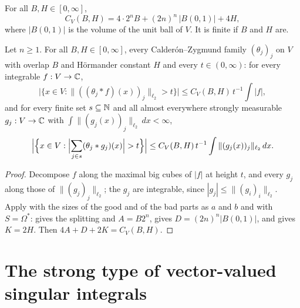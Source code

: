 \begin{definition}
\label{def:vector-weak-const}
\leanok
For all $B, H \in [0, \infty]$,
\[
  C_V(B, H) = 4 \cdot 2^n B + (2n)^n \, |B(0, 1)| + 4 H ,
\]
where $|B(0, 1)|$ is the volume of the unit ball of $V$. It is finite if $B$ and $H$ are.
\end{definition}

\begin{theorem}
\label{thm:vector-valued-weak-type}
\leanok
{}
Let $n \geq 1$. For all $B, H \in [0, \infty]$, every Calder\'on--Zygmund family
$(\theta_j)_j$ on $V$ with overlap $B$ and H\"ormander constant $H$ and every
$t \in (0, \infty)$:
for every integrable $f : V \to \mathbb{C}$,
\[
  \bigl|\{x \in V : \|((\theta_j * f)(x))_j\|_{\ell_2} > t\}\bigr|
  \leq C_V(B, H) \, t^{-1} \int |f| ,
\]
and for every finite set $s \subseteq \mathbb{N}$ and all almost everywhere strongly measurable
$g_j : V \to \mathbb{C}$ with $\int \|(g_j(x))_j\|_{\ell_2} \, dx < \infty$,
\[
  \Bigl|\Bigl\{x \in V : \Bigl|\sum_{j \in s} (\theta_j * g_j)(x)\Bigr| > t\Bigr\}\Bigr|
  \leq C_V(B, H) \, t^{-1} \int \|(g_j(x))_j\|_{\ell_2} \, dx .
\]
\end{theorem}

\begin{proof}
\leanok
Decompose $f$ along the maximal big cubes of $|f|$ at height $t$, and every $g_j$ along those
of $\|(g_j)_j\|_{\ell_2}$; the $g_j$ are integrable, since $|g_j| \leq \|(g_i)_i\|_{\ell_2}$.
Apply  with the sizes of the good and of the bad parts as $a$
and $b$ and with $S = \Omega^*$:  gives the splitting and $A = B 2^n$,
 gives $D = (2n)^n |B(0, 1)|$, and
 gives $K = 2H$. Then $4A + D + 2K = C_V(B, H)$.
\end{proof}

\section{The strong type of vector-valued singular integrals}
\label{sec:vector-valued-strong-type}

